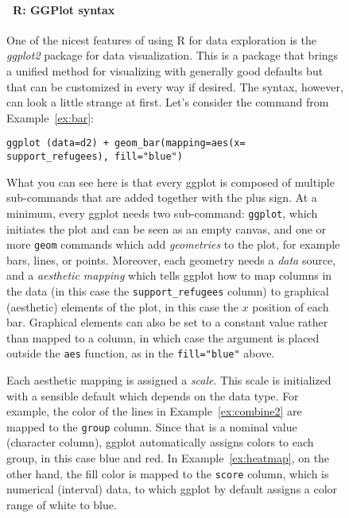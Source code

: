 %

\begin{figure}
  \vspace{-1em}
\begin{feature}
\footnotesize  \paragraph{\footnotesize\ R: GGPlot syntax}

One of the nicest features of using R for data exploration is the \emph{ggplot2} package for data visualization. This is a package that brings a unified method for visualizing with generally good defaults but that can be customized in every way if desired. The syntax, however, can look a little strange at first.
Let's consider the command from Example~\ref{ex:bar}:
\begin{verbatim}
ggplot (data=d2) + geom_bar(mapping=aes(x= support_refugees), fill="blue")
\end{verbatim}
What you can see here is that every ggplot is composed of multiple sub-commands that are added together with the plus sign.
At a minimum, every ggplot needs two sub-command: \texttt{ggplot},
which initiates the plot and can be seen as an empty canvas,
and one or more \texttt{geom} commands which add \emph{geometries} to the plot,
for example bars, lines, or points.
Moreover, each geometry needs a \emph{data} source, and a \emph{aesthetic mapping}
which tells ggplot how to map columns in the data (in this case the \verb|support_refugees| column) to graphical (aesthetic) elements of the plot,
in this case the $x$ position of each bar.
Graphical elements can also be set to a constant value rather than mapped to a column,
in which case the argument is placed outside the \texttt{aes} function, as in the \verb|fill="blue"| above.

Each aesthetic mapping is assigned a \emph{scale}.
This scale is initialized with a sensible default which depends on the data type.
For example, the color of the lines in Example~\ref{ex:combine2} are mapped to the \verb|group| column.
Since that is a nominal value (character column), ggplot automatically assigns colors to each group,
in this case blue and red.
In Example~\ref{ex:heatmap}, on the other hand, the fill color is mapped to the \verb|score| column, which is numerical (interval) data, to which ggplot by default assigns a color range of white to blue.


\end{feature}
\end{figure}
